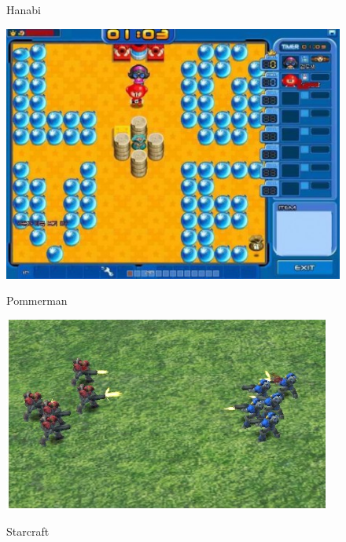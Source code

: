 \documentclass[notheorems, aspectratio=54]{beamer}
\begin{document}
\begin{frame}
\begin{figure}[h]
\begin{minipage}{0.3\textwidth}
    \begin{center}
    Hanabi
    \end{center}
  \end{minipage}
  \hspace{0.02\linewidth}
  \begin{minipage}{0.3\textwidth}
    \includegraphics[width=\textwidth]{Pommerman.jpg}
    \begin{center}
    Pommerman
    \end{center}
  \end{minipage}
  \begin{minipage}{0.3\textwidth}
    \includegraphics[width=\textwidth]{ starcraft.png}
    \begin{center}
    Starcraft
    \end{center}
  \end{minipage}
  \hspace{0.02\linewidth}

\end{figure}
\end{frame}
\end{document}
